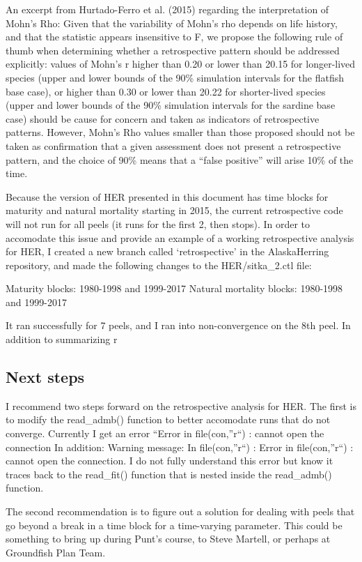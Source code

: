 \documentclass[]{article}
\begin{document}
An excerpt from Hurtado-Ferro et al. (2015) regarding the interpretation
of Mohn's Rho: Given that the variability of Mohn's rho depends on life
history, and that the statistic appears insensitive to F, we propose the
following rule of thumb when determining whether a retrospective pattern
should be addressed explicitly: values of Mohn's r higher than 0.20 or
lower than 20.15 for longer-lived species (upper and lower bounds of the
90\% simulation intervals for the flatfish base case), or higher than
0.30 or lower than 20.22 for shorter-lived species (upper and lower
bounds of the 90\% simulation intervals for the sardine base case)
should be cause for concern and taken as indicators of retrospective
patterns. However, Mohn's Rho values smaller than those proposed should
not be taken as confirmation that a given assessment does not present a
retrospective pattern, and the choice of 90\% means that a ``false
positive'' will arise 10\% of the time.

Because the version of HER presented in this document has time blocks
for maturity and natural mortality starting in 2015, the current
retrospective code will not run for all peels (it runs for the first 2,
then stops). In order to accomodate this issue and provide an example of
a working retrospective analysis for HER, I created a new branch called
`retrospective' in the AlaskaHerring repository, and made the following
changes to the HER/sitka\_2.ctl file:

Maturity blocks: 1980-1998 and 1999-2017 Natural mortality blocks:
1980-1998 and 1999-2017

It ran successfully for 7 peels, and I ran into non-convergence on the
8th peel. In addition to summarizing r

\subsection{Next steps}\label{next-steps-3}

I recommend two steps forward on the retrospective analysis for HER. The
first is to modify the read\_admb() function to better accomodate runs
that do not converge. Currently I get an error ``Error in
file(con,''r``) : cannot open the connection In addition: Warning
message: In file(con,''r``) : Error in file(con,''r``) : cannot open the
connection. I do not fully understand this error but know it traces back
to the read\_fit() function that is nested inside the read\_admb()
function.

The second recommendation is to figure out a solution for dealing with
peels that go beyond a break in a time block for a time-varying
parameter. This could be something to bring up during Punt's course, to
Steve Martell, or perhaps at Groundfish Plan Team.
\end{document}
